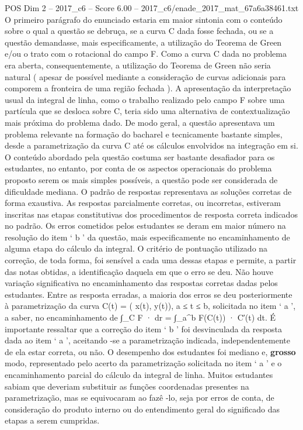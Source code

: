 \begin{textsample}{POS Dim 2 – 2017\_c6 – Score 6.00 – 2017\_c6/enade\_2017\_mat\_67a6a38461.txt}
O primeiro parágrafo do enunciado estaria em maior sintonia com o conteúdo sobre o qual a questão se debruça, se a curva C dada fosse fechada, ou se a questão demandasse, mais especificamente, a utilização do Teorema de Green e/ou o trato com o rotacional do campo F.
Como a curva C dada no problema era aberta, consequentemente, a utilização do Teorema de Green não seria natural ( apesar de possível mediante a consideração de curvas adicionais para comporem a fronteira de uma região fechada ).
A apresentação da interpretação usual da integral de linha, como o trabalho realizado pelo campo F sobre uma partícula que se desloca sobre C, teria sido uma alternativa de contextualização mais próxima do problema dado.
De modo geral, a questão apresentava um problema relevante na formação do bacharel e tecnicamente bastante simples, desde a parametrização da curva C até os cálculos envolvidos na integração em si.
O conteúdo abordado pela questão costuma ser bastante desafiador para os estudantes, no entanto, por conta de os aspectos operacionais do problema proposto serem os mais simples possíveis, a questão pode ser considerada de dificuldade mediana.
O padrão de respostas representava as soluções corretas de forma exaustiva.
As respostas parcialmente corretas, ou incorretas, estiveram inscritas nas etapas constitutivas dos procedimentos de resposta correta indicados no padrão.
Os erros cometidos pelos estudantes se deram em maior número na resolução do item ‘ b ’ da questão, mais especificamente no encaminhamento de alguma etapa do cálculo da integral.
O critério de pontuação utilizado na correção, de toda forma, foi sensível a cada uma dessas etapas e permite, a partir das notas obtidas, a identificação daquela em que o erro se deu.
Não houve variação significativa no encaminhamento das respostas corretas dadas pelos estudantes.
Entre as resposta erradas, a maioria dos erros se deu posteriormente à parametrização da curva C(t) = ( x(t), y(t)), a ≤ t ≤ b, solicitada no item ‘ a ’, a saber, no encaminhamento de ∫\_C F · dr = ∫\_a\textasciicircum{}b F(C(t)) · C′(t) dt.
É importante ressaltar que a correção do item ‘ b ’ foi desvinculada da resposta dada ao item ‘ a ’, aceitando -se a parametrização indicada, independentemente de ela estar correta, ou não.
O desempenho dos estudantes foi mediano e, \textbf{grosso} modo, representado pelo acerto da parametrização solicitada no item ‘ a ’ e o encaminhamento parcial do cálculo da integral de linha.
Muitos estudantes sabiam que deveriam substituir as funções coordenadas presentes na parametrização, mas se equivocaram ao fazê -lo, seja por erros de conta, de consideração do produto interno ou do entendimento geral do significado das etapas a serem cumpridas.

\end{textsample}
